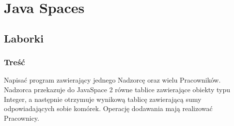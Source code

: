 \newpage
\section{Java Spaces}
	\subsection{Laborki}
		\subsubsection{Treść}
			Napisać program zawierający jednego Nadzorcę oraz wielu Pracowników. Nadzorca przekazuje do JavaSpace 2 równe tablice zawierające obiekty typu Integer, a następnie otrzymuje wynikową tablicę zawierającą sumy odpowiadających sobie komórek. Operację dodawania mają realizować Pracownicy.
